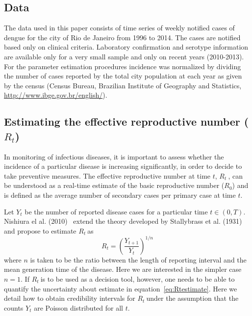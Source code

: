 \documentclass[10pt]{article}
\def \rr {$R_{t}\:$}
\begin{document}
\subsection*{Data} 

The data used in this paper consists of time 
series of weekly notified cases of dengue for the 
city of Rio de Janeiro from 1996 to 2014. The cases are notified 
based only on clinical criteria.
Laboratory confirmation and serotype 
information are available only for a very small sample and only on recent 
years (2010-2013).
For the parameter estimation  procedures incidence was normalized by dividing 
the number of cases reported by the total city population at each year as given 
by the census (Census Bureau, Brazilian Institute of Geography and Statistics, 
\url{http://www.ibge.gov.br/english/}).

\subsection*{Estimating the effective reproductive number ($R_t$)}

In monitoring of infectious diseases, it is important to assess whether the 
incidence of a  particular disease is increasing significantly, in order to 
decide to take preventive measures.
The effective reproductive number at time $t$, \rr, can be understood as a 
real-time estimate of the basic reproductive number ($R_{0}$) and is defined as 
the average number of secondary cases per primary case at time $t$.

Let $Y_t$ be the number of reported disease cases for a particular time $t \in 
(0, T)$.
Nishiura el al. (2010)~\citep{nishiura} extend the theory developed by 
Stallybrass et al. (1931)~\citep{stallybrass} and propose to estimate \rr as
\begin{equation}
\label{eq:Rtestimate}
R_t = \left( \frac{Y_{t+1}}{Y_t}\right)^{1/n}
\end{equation}
where $n$ is taken to be the ratio between the length of reporting interval and 
the mean generation time of the disease.
Here we are interested in the simpler case $n=1$.
If \rr is to be used as a decision tool, however, one needs to be able to 
quantify the 
uncertainty about estimate in equation~\ref{eq:Rtestimate}. 
Here we detail how to obtain credibility intervals for \rr under the assumption 
that the counts $Y_t$ are Poisson distributed for all $t$.
\end{document}
